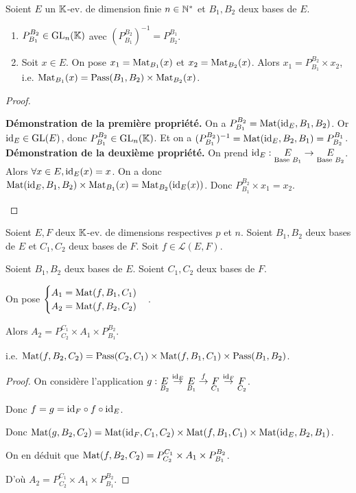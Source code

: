 \documentclass[12pt,a4paper]{report}
\begin{document}
\begin{property}
    Soient $E$ un $\mathbb{K}$-ev. de dimension finie $n \in \mathbb{N}^*$ et $B_1, B_2$ deux bases de $E$.
    \begin{enumerate}
        \item $P_{B_1}^{B_2} \in \mathrm{GL}_n(\mathbb{K})$ avec $(P_{B_1}^{B_2})^{-1} = P_{B_2}^{B_1}$.
        \item Soit $x \in E$. On pose $x_1 = \mathrm{Mat}_{B_1}(x)$ et $x_2 = \mathrm{Mat}_{B_2}(x)$. Alors $x_1 = P_{B_1}^{B_2} \times x_2$, i.e. $\mathrm{Mat}_{B_1}(x) = \mathrm{Pass}(B_1,B_2) \times \mathrm{Mat}_{B_2}(x)$.
    \end{enumerate}
\end{property}

\begin{proof}
    \begin{outline}
        \1 \textbf{Démonstration de la première propriété.}
        \2 On a $P_{B_1}^{B_2} = \mathrm{Mat}(\mathrm{id}_E, B_1, B_2)$.
        \2 Or $\mathrm{id}_E \in \mathrm{GL}(E)$, donc $P_{B_1}^{B_2} \in \mathrm{GL}_n(\mathbb{K})$.
        \2 Et on a $(P_{B_1}^{B_2})^{-1} = \mathrm{Mat}(\mathrm{id}_E, B_2, B_1) = P_{B_2}^{B_1}$.
        \1 \textbf{Démonstration de la deuxième propriété.}
        \2 On prend $\mathrm{id}_E : \underset{\text{Base }B_1}{E} \to \underset{\text{Base }B_2}{E}$.
        \2 Alors $\forall x \in E, \mathrm{id}_E(x) = x$. On a donc $\mathrm{Mat}(\mathrm{id}_E, B_1, B_2) \times \mathrm{Mat}_{B_1}(x) = \mathrm{Mat}_{B_2}(\mathrm{id}_E(x))$.
        \2 Donc $P_{B_1}^{B_2} \times x_1 = x_2$.
    \end{outline}
\end{proof}

\begin{property}
    Soient $E,F$ deux $\mathbb{K}$-ev. de dimensions respectives $p$ et $n$. Soient $B_1, B_2$ deux bases de $E$ et $C_1, C_2$ deux bases de $F$. Soit $f \in \mathcal L(E,F)$.

    Soient $B_1, B_2$ deux bases de $E$. Soient $C_1, C_2$ deux bases de $F$.

    On pose $\begin{cases} A_1 = \mathrm{Mat}(f,B_1,C_1) \\ A_2 = \mathrm{Mat}(f,B_2,C_2) \end{cases}$.

    Alors $A_2 = P_{C_2}^{C_1} \times A_1 \times P_{B_1}^{B_2}$.

    i.e. $\mathrm{Mat}(f,B_2,C_2) = \mathrm{Pass}(C_2,C_1) \times \mathrm{Mat}(f,B_1,C_1) \times \mathrm{Pass}(B_1,B_2)$.
\end{property}

\begin{proof}
    On considère l'application $g : \underset{B_2}{E} \overset{\mathrm{id}_E}{\to} \underset{B_1}{E} \overset{f}{\to} \underset{C_1}{F} \overset{\mathrm{id}_F}{\to} \underset{C_2}{F}$.

    Donc $f = g = \mathrm{id}_F \circ f \circ \mathrm{id}_E$.

    Donc $\mathrm{Mat}(g, B_2, C_2) = \mathrm{Mat}(\mathrm{id}_F, C_1, C_2) \times \mathrm{Mat}(f, B_1, C_1) \times \mathrm{Mat}(\mathrm{id}_E, B_2, B_1)$.

    On en déduit que $\mathrm{Mat}(f, B_2, C_2) = P_{C_2}^{C_1} \times A_1 \times P_{B_1}^{B_2}$.

    D'où $A_2 = P_{C_2}^{C_1} \times A_1 \times P_{B_1}^{B_2}$.
\end{proof}
\end{document}
